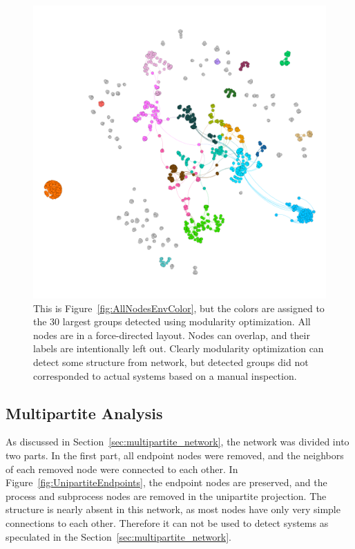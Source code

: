 \documentclass[english, 12pt, a4paper, sci, utf8, a-2b, online, obeyspaces]{aaltothesis}
\begin{document}
\begin{figure}[htb]
  \centering
  \includegraphics[width=\textwidth]{pictures/network/AllNodesModColor.png}
  \caption{This is Figure~\ref{fig:AllNodesEnvColor}, but the colors are assigned to the 30 largest groups detected using modularity optimization. All nodes are in a force-directed layout. Nodes can overlap, and their labels are intentionally left out. Clearly modularity optimization can detect some structure from network, but detected groups did not corresponded to actual systems based on a manual inspection.}
  \label{fig:AllNodesModColor}
\end{figure}

\clearpage
\subsection{Multipartite Analysis}
As discussed in Section~\ref{sec:multipartite_network}, the network was divided into two parts. In the first part, all endpoint nodes were removed, and the neighbors of each removed node were connected to each other. In Figure~\ref{fig:UnipartiteEndpoints}, the endpoint nodes are preserved, and the process and subprocess nodes are removed in the unipartite projection. The structure is nearly absent in this network, as most nodes have only very simple connections to each other. Therefore it can not be used to detect systems as speculated in the Section~\ref{sec:multipartite_network}.
\end{document}
